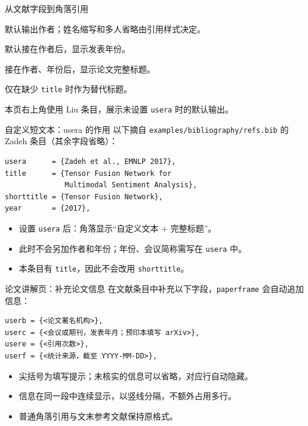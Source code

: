 \begin{frame}{从文献字段到角落引用}
  \begin{description}
    \item[\texttt{author}] 默认输出作者；姓名缩写和多人省略由引用样式决定。
    \item[\texttt{year}] 默认接在作者后，显示发表年份。
    \item[\texttt{title}] 接在作者、年份后，显示论文完整标题。
    \item[\texttt{shorttitle}] 仅在缺少 \texttt{title} 时作为替代标题。
  \end{description}
  \medskip
  本页右上角使用 Liu 条目，展示未设置 \texttt{usera} 时的默认输出。
\end{frame}

\begin{frame}[fragile]{自定义短文本：usera 的作用}
  以下摘自 \texttt{examples/bibliography/refs.bib} 的 Zadeh 条目（其余字段省略）：
  \begin{verbatim}
usera      = {Zadeh et al., EMNLP 2017},
title      = {Tensor Fusion Network for
              Multimodal Sentiment Analysis},
shorttitle = {Tensor Fusion Network},
year       = {2017},
  \end{verbatim}
  \begin{itemize}
    \item 设置 \texttt{usera} 后：角落显示“自定义文本 + 完整标题”。
    \item 此时不会另加作者和年份；年份、会议简称需写在 \texttt{usera} 中。
    \item 本条目有 \texttt{title}，因此不会改用 \texttt{shorttitle}。
  \end{itemize}
\end{frame}

\begin{frame}[fragile]{论文讲解页：补充论文信息}
  在文献条目中补充以下字段，\texttt{paperframe} 会自动追加信息：
  \begin{verbatim}
userb = {<论文署名机构>},
userc = {<会议或期刊，发表年月；预印本填写 arXiv>},
usere = {<引用次数>},
userf = {<统计来源，截至 YYYY-MM-DD>},
  \end{verbatim}
  \begin{itemize}
    \item 尖括号为填写提示；未核实的信息可以省略，对应行自动隐藏。
    \item 信息在同一段中连续显示，以竖线分隔，不额外占用多行。
    \item 普通角落引用与文末参考文献保持原格式。
  \end{itemize}
\end{frame}

